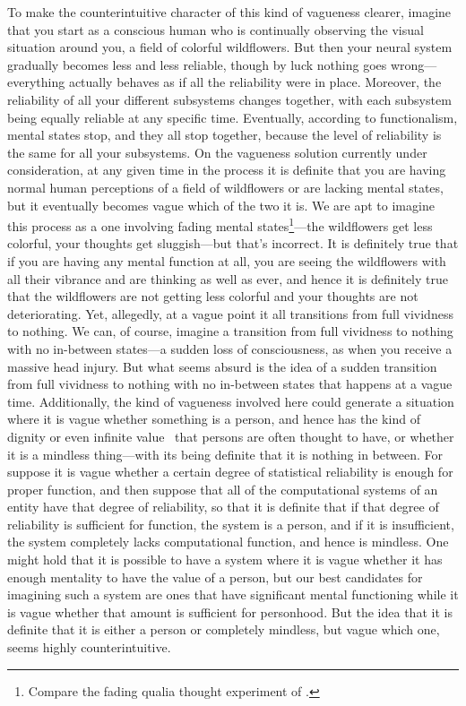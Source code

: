 To make the counterintuitive character of this kind of vagueness clearer, imagine that you start as a conscious human
who is continually observing the visual situation around you, a field of colorful wildflowers. But then your neural system gradually 
becomes less and less reliable, though by luck nothing goes wrong---everything actually behaves as if all the reliability were 
in place. Moreover, the reliability of all your different subsystems changes together, with each subsystem being equally reliable at any specific time. Eventually, according to functionalism, mental states 
stop, and they all stop together, because the level of reliability is the same for all your subsystems. On the vagueness
solution currently under consideration, at any given time in the process it is definite that you 
are having normal human perceptions of a field of wildflowers or are lacking mental states, but it eventually becomes vague which of the two it is.
We are apt to imagine this process as a one involving fading mental states\footnote{Compare the fading qualia thought experiment of .}---the wildflowers get less colorful, your thoughts get 
sluggish---but that's incorrect. It is definitely true that if you are having any mental function at all, you are seeing 
the wildflowers with all their vibrance and are thinking as well as ever, and hence it is definitely true that the 
wildflowers are not getting less colorful and your thoughts are not deteriorating. Yet, allegedly, at a vague point 
it all transitions from full vividness to nothing. We can, of course, imagine a transition from full vividness to nothing
with no in-between states---a sudden loss of consciousness, as when you receive a massive head injury. But what 
seems absurd is the idea of a sudden transition from full vividness to nothing with no in-between states that 
happens at a vague time.
Additionally, the kind of vagueness involved here could generate a situation where it is vague whether something is a 
person, and hence has the kind of dignity or even infinite value~\parencite{BRInfinite} that persons are often thought to have, or whether
it is a mindless thing---with its being definite that it is nothing in between. For suppose it is vague whether
a certain degree of statistical reliability is enough for proper function, and then suppose that all of the computational 
systems of an entity have that degree of reliability, so that it is definite that if that degree of reliability is sufficient
for function, the system is a person, and if it is insufficient, the system completely lacks computational function, and hence
is mindless. One might hold that it is possible to have a system where it is vague whether it has enough mentality to have 
the value of a person, but our best candidates for imagining such a system are ones that have significant mental functioning while it is vague whether that amount is sufficient for personhood. But the idea that it is definite that it is either a 
person or completely mindless, but vague which one, seems highly counterintuitive.


